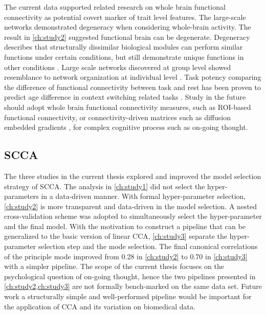 The current data supported related research on whole brain functional connectivity as potential covert marker of trait level features. The large-scale networks demonstrated degeneracy when considering whole-brain activity. The result in \cref{ch:study2} suggested functional brain can be degenerate. Degeneracy describes that structurally dissimilar biological modules can perform similar functions under certain conditions, but still demonstrate unique functions in other conditions \cite{Buckner2013}. Large scale networks discovered at group level showed resemblance to network organization at individual level \cite{Finn2015}. Task potency comparing the difference of functional connectivity between task and rest has been proven to predict age difference in context switching related tasks \cite{Chauvin2018}. Study in the future should adopt whole brain functional connectivity measures, such as ROI-based functional connectivity, or connectivity-driven matrices such as diffusion embedded gradients \cite{Margulies2016,Marquand2017}, for complex cognitive process such as on-going thought.

\subsection{SCCA}

The three studies in the current thesis explored and improved the model selection strategy of SCCA. The analysis in \cref{ch:study1} did not select the hyper-parameters in a data-driven manner. With formal hyper-parameter selection, \cref{ch:study2} is more transparent and data-driven in the model selection. A nested cross-validation scheme was adopted to simultaneously select the hyper-parameter and the final model. With the motivation to construct a pipeline that can be generalized to the basic version of linear CCA, \cref{ch:study3} separate the hyper-parameter selection step and the mode selection. The final canonical correlations of the principle mode improved from 0.28 in \cref{ch:study2} to 0.70 in \cref{ch:study3} with a simpler pipeline. The scope of the current thesis focuses on the psychological question of on-going thought, hence the two pipelines presented in \cref{ch:study2,ch:study3} are not formally bench-marked on the same data set. Future work a structurally simple and well-performed pipeline would be important for the application of CCA and its variation on biomedical data.

